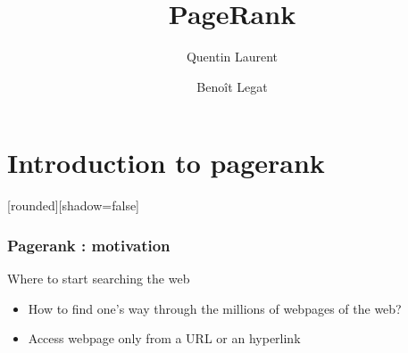 \documentclass[10pt]{beamer}
\title{PageRank}
\author{
  Quentin Laurent
  \and
  Benoît Legat
}
\begin{document}
\begin{frame}
  \maketitle
\end{frame}
\begin{frame}
  \tableofcontents
\end{frame}
\section{Introduction to pagerank}
\begin{frame}
  \tableofcontents[currentsection]
\end{frame}
[rounded][shadow=false]
\begin{frame}
  \frametitle{Pagerank : motivation}
  \begin{block}{Where to start searching the web}
  \begin{itemize}
    \item How to find one's way through the millions of webpages of the web?
    \item Access webpage only from a URL or an hyperlink
    \end{itemize}
  \end{block}
\end{frame}
\end{document}
